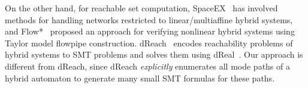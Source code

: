 On the other hand,
for reachable set computation, 
SpaceEX~\cite{DBLP:conf/cav/FrehseGDCRLRGDM11}
has involved methods for handling networks restricted to linear/multiaffine hybrid systems,
and 
Flow*~\cite{DBLP:conf/cav/ChenAS13} proposed an approach for verifying
nonlinear hybrid systems using Taylor model flowpipe construction. 
%
dReach~\cite{dReach}
encodes reachability problems of hybrid systems to SMT problems and
solves them using %
dReal~\cite{dReal}.
%
Our approach is different from dReach, 
since dReach \emph{explicitly} enumerates all mode paths of a hybrid automaton
to generate many small SMT formulas for these paths.





